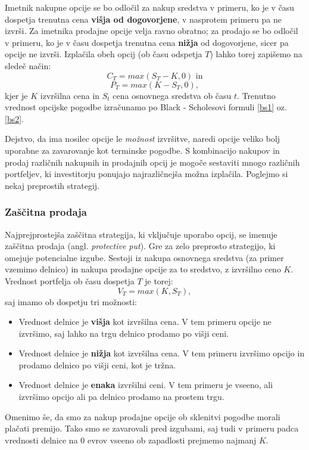 \documentclass[12pt,a4paper]{amsart}
\theoremstyle{definition} %
\theoremstyle{plain} %
\begin{document}
Imetnik nakupne opcije se bo odločil za nakup sredstva v primeru, ko je v času dospetja 
trenutna cena \textbf{višja od dogovorjene}, v nasprotem primeru pa ne izvrši. Za imetnika 
prodajne opcije velja ravno obratno; za prodajo se bo odločil v primeru, ko je v času 
dospetja trenutna cena \textbf{nižja} od dogovorjene, sicer pa opcije ne izvrši. 
Izplačila obeh opcij (ob času odspetja $T$) lahko torej zapišemo na sledeč način:
$$C_T = max(S_T - K, 0) \text{ in}$$ 
$$P_T = max(K - S_T, 0),$$
kjer je $K$ izvršilna cena in $S_t$ cena osnovnega sredstva ob času $t$. Trenutno 
vrednost opcijske pogodbe izračunamo po Black - Scholesovi formuli \eqref{bs1} oz. \eqref{bs2}. 

Dejstvo, da ima nosilec opcije le \textit{možnost} izvršitve, naredi opcije veliko bolj 
uporabne za zavarovanje kot terminske pogodbe. S kombinacijo nakupov in prodaj 
različnih nakupnih in prodajnih opcij je mogoče sestaviti mnogo različnih portfeljev, 
ki investitorju ponujajo najrazličnejša možna izplačila. Poglejmo si nekaj preprostih 
strategij.

\subsubsection{Zaščitna prodaja}
Najprejprostejša zaščitna strategija, ki vključuje uporabo opcij, se imenuje zaščitna 
prodaja (angl. \textit{protective put}). 	Gre za zelo preprosto strategijo, ki omejuje 
potencialne izgube. Sestoji iz nakupa osnovnega sredstva (za primer vzemimo delnico) 
in nakupa prodajne opcije za to sredstvo, z izvršilno ceno $K$. Vrednost portfelja ob 
času dospetja $T$ je torej:
$$V_T = max(K, S_T),$$
saj imamo ob dospetju tri možnosti:
\begin{itemize}
  \item Vrednost delnice je \textbf{višja} kot izvršilna cena. V tem primeru opcije ne izvršimo,
	saj lahko na trgu delnico prodamo po višji ceni.
  \item Vrednost delnice je \textbf{nižja} kot izvršilna cena. V tem primeru izvršimo opcijo in 
	prodamo delnico po višji ceni, kot je tržna.
  \item Vrednost delnice je \textbf{enaka} izvršilni ceni. V tem primeru je vseeno, ali izvršimo 
	opcijo ali pa delnico prodamo na prostem trgu.
\end{itemize}
Omenimo še, da smo za nakup prodajne opcije ob sklenitvi pogodbe morali plačati 
premijo. Tako smo se zavarovali pred izgubami, saj tudi v primeru padca vrednosti delnice 
na $0$ evrov vseeno ob zapadlosti prejmemo najmanj $K$.
\end{document}
